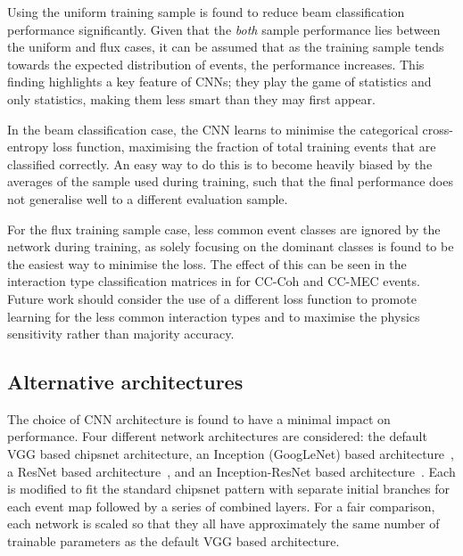 Using the uniform training sample is found to reduce beam classification performance
significantly. Given that the \emph{both} sample performance lies between the uniform and flux
cases, it can be assumed that as the training sample tends towards the expected distribution of
events, the performance increases. This finding highlights a key feature of CNNs; they play the
game of statistics and only statistics, making them less smart than they may first appear.

In the beam classification case, the CNN learns to minimise the categorical cross-entropy loss
function, maximising the fraction of total training events that are classified correctly. An easy
way to do this is to become heavily biased by the averages of the sample used during training,
such that the final performance does not generalise well to a different evaluation sample.

For the flux training sample case, less common event classes are ignored by the network during
training, as solely focusing on the dominant classes is found to be the easiest way to minimise
the loss. The effect of this can be seen in the interaction type classification matrices in
 for CC-Coh and CC-MEC events. Future work should consider the
use of a different loss function to promote learning for the less common interaction types and to
maximise the physics sensitivity rather than majority accuracy.

\subsection{Alternative architectures} %
\label{sec:results_alt_arch} %

The choice of CNN architecture is found to have a minimal impact on performance. Four different
network architectures are considered: the default VGG based chipsnet architecture, an Inception
(GoogLeNet) based architecture~\cite{szegedy2015}, a ResNet based
architecture~\cite{he2016_improved}, and an Inception-ResNet based
architecture~\cite{szegedy2016}. Each is modified to fit the standard chipsnet pattern with
separate initial branches for each event map followed by a series of combined layers. For a fair
comparison, each network is scaled so that they all have approximately the same number of
trainable parameters as the default VGG based architecture.

